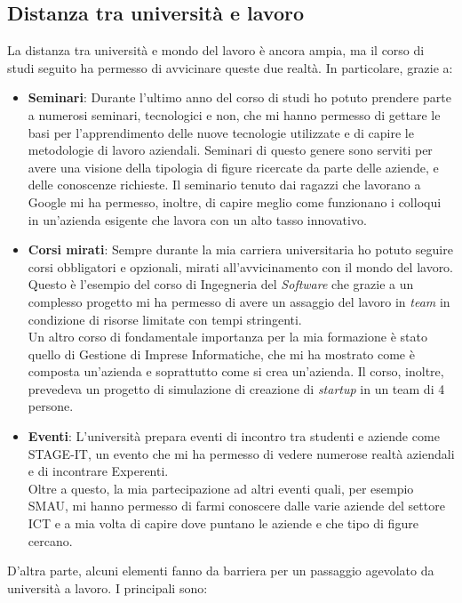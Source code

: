 \subsection{Distanza tra universit\`a e lavoro}
La distanza tra universit\`a e mondo del lavoro \`e ancora ampia, ma il corso di studi seguito ha permesso di avvicinare queste due realt\`a. In particolare, grazie a:

\begin{itemize}
	\item \textbf{Seminari}: Durante l'ultimo anno del corso di studi ho potuto prendere parte a numerosi seminari, tecnologici e non, che mi hanno permesso di gettare le basi per l'apprendimento delle nuove tecnologie utilizzate e di capire le metodologie di lavoro aziendali. Seminari di questo genere sono serviti per avere una visione della tipologia di figure ricercate da parte delle aziende, e delle conoscenze richieste. Il seminario tenuto dai ragazzi che lavorano a Google mi ha permesso, inoltre, di capire meglio come funzionano i colloqui in un'azienda esigente che lavora con un alto tasso innovativo.
	
	\item \textbf{Corsi mirati}: Sempre durante la mia carriera universitaria ho potuto seguire corsi obbligatori e opzionali, mirati all'avvicinamento con il mondo del lavoro. Questo \`e l'esempio del corso di Ingegneria del \textit{Software} che grazie a un complesso progetto mi ha permesso di avere un assaggio del lavoro in \textit{team} in condizione di risorse limitate con tempi stringenti.\\
	Un altro corso di fondamentale importanza per la mia formazione \`e stato quello di Gestione di Imprese Informatiche, che mi ha mostrato come \`e composta un'azienda e soprattutto come si crea un'azienda. Il corso, inoltre, prevedeva un progetto di simulazione di creazione di \textit{startup} in un team di 4 persone.
	
	\item \textbf{Eventi}: L'universit\`a prepara eventi di incontro tra studenti e aziende come STAGE-IT, un evento che mi ha permesso di vedere numerose realt\`a aziendali e di incontrare Experenti.\\
	Oltre a questo, la mia partecipazione ad altri eventi quali, per esempio SMAU, mi hanno permesso di farmi conoscere dalle varie aziende del settore ICT e a mia volta di capire dove puntano le aziende e che tipo di figure cercano.\\
\end{itemize}
\noindent
D'altra parte, alcuni elementi fanno da barriera per un passaggio agevolato da universit\`a a lavoro. I principali sono:

